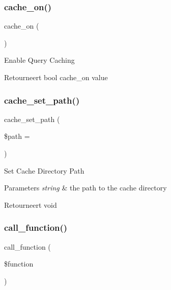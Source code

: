 \subsubsection{\texorpdfstring{cache\_on()}{cache\_on()}}
{\footnotesize\ttfamily cache\+\_\+on (\begin{DoxyParamCaption}{ }\end{DoxyParamCaption})}

Enable Query Caching

\begin{DoxyReturn}{Retourneert}
bool cache\+\_\+on value 
\end{DoxyReturn}
\mbox{\label{class_c_i___d_b__driver_aec8df4c9b46f8ba06831911d4c3121df}} 
\subsubsection{\texorpdfstring{cache\_set\_path()}{cache\_set\_path()}}
{\footnotesize\ttfamily cache\+\_\+set\+\_\+path (\begin{DoxyParamCaption}\item[{}]{\$path = {\ttfamily \textquotesingle{}\textquotesingle{}} }\end{DoxyParamCaption})}

Set Cache Directory Path


\begin{DoxyParams}{Parameters}
{\em string} & the path to the cache directory \\
\hline
\end{DoxyParams}
\begin{DoxyReturn}{Retourneert}
void 
\end{DoxyReturn}
\mbox{\label{class_c_i___d_b__driver_af7892f758c89d0e243def92140dbe099}} 
\subsubsection{\texorpdfstring{call\_function()}{call\_function()}}
{\footnotesize\ttfamily call\+\_\+function (\begin{DoxyParamCaption}\item[{}]{\$function }\end{DoxyParamCaption})}

